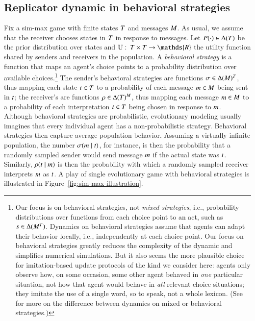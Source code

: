 \documentclass[fleqn,reqno,10pt]{article}
\renewcommand{\Pr}{\ensuremath{P}}
\begin{document}
\subsection{Replicator dynamic in behavioral strategies}
\label{sec:repl-dynam-behav}

Fix a sim-max game with finite states $T$ and messages $M$. As usual, we assume
that the receiver chooses states in $T$ in response to messages. Let
$\Pr(\cdot) \in \Delta(\States)$ be the prior distribution over states and
$\Util \mycolon \States \times \States \rightarrow \mathds{R}$ the utility function shared by
senders and receivers in the population. A \emph{behavioral strategy} is a function that maps
an agent's choice points to a probability distribution over available
choices.\footnote{\label{fn:mixedStrats}Our focus is on behavioral strategies, not \emph{mixed
    strategies}, i.e., probability distributions over functions from each choice point to an
  act, such as $s \in \Delta(M^{T})$.  Dynamics on behavioral strategies assume
  that agents can adapt their behavior locally, i.e., independently at each choice point. Our
  focus on behavioral strategies greatly reduces the complexity of the dynamic and simplifies
  numerical simulations. But it also seems the more plausible choice for imitation-based update
  protocols of the kind we consider here: agents only observe how, on some occasion, some other
  agent behaved in \emph{one} particular situation, not how that agent would behave in
  \emph{all} relevant choice situations; they imitate the use of a single word, so to speak,
  not a whole lexicon. (See \citet{Cressman2003:Evolutionary-Dy} for more on the difference
  between dynamics on mixed or behavioral strategies.)} The sender's behavioral strategies are
functions $\sigma \in \Delta(M)^T$, thus mapping each state $t \in T$
to a probability of each message $m \in M$ being sent in $t$; the receiver's
are functions $\rho \in \Delta(T)^M$, thus mapping each message
$m \in M$ to a probability of each interpretation $t \in T$ being chosen
in response to $m$. Although behavioral strategies are probabilistic, evolutionary
modeling usually imagines that every individual agent has a non-probabilistic
strategy. Behavioral strategies then capture average population behavior. Assuming a virtually
infinite population, the number $\sigma(m \mid t)$, for instance, is then the
probability that a randomly sampled sender would send message $m$ if the actual state was
$t$. Similarly, $\rho(t \mid m)$ is then the probability with which a
randomly sampled receiver interprets $m$ as $t$. A play of single evolutionary game
with behavioral strategies is illustrated in Figure~\ref{fig:sim-max-illustration}.
\end{document}

